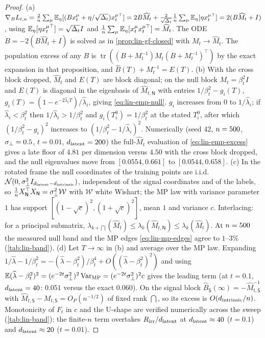 \begin{proof}
(a) $\nabla_BL_{t,n}=\frac2n\sum_\mu\mathbb{E}_\eta[(Bx_t^\mu+\eta/\sqrt{\Delta_t})x_t^{\mu\top}]=2B\widehat M_t+\frac{2}{\sqrt{\Delta_t}}\frac1n\sum_\mu\mathbb{E}_\eta[\eta x_t^{\mu\top}]=2(B\widehat M_t+I)$, using $\mathbb{E}_\eta[\eta x_t^{\mu\top}]=\sqrt{\Delta_t}I$ and $\frac1n\sum_\mu\mathbb{E}_\eta[x_t^\mu x_t^{\mu\top}]=\widehat M_t$. The ODE $\dot B=-2(B\widehat M_t+I)$ is solved as in \cref{prop:lin-gf-closed} with $M_t\to\widehat M_t$. The population excess of any $B$ is $\operatorname{tr}((B+M_t^{-1})M_t(B+M_t^{-1})^{\top})$ by the exact expansion in that proposition, and $\widehat B(T)+M_t^{-1}=E(T)$.
(b) With the cross block dropped, $\widehat M_t$ and $E(T)$ are block diagonal; on the null block $M_t=\beta_t^2I$ and $E(T)$ is diagonal in the eigenbasis of $\widehat M_{t,\mathsf N}$ with entries $1/\beta_t^2-g_i(T)$, $g_i(T)=(1-e^{-2\widehat\lambda_iT})/\widehat\lambda_i$, giving \eqref{eq:lin-emp-null}. $g_i$ increases from $0$ to $1/\widehat\lambda_i$; if $\widehat\lambda_i<\beta_t^2$ then $1/\widehat\lambda_i>1/\beta_t^2$ and $g_i(T^0_i)=1/\beta_t^2$ at the stated $T^0_i$, after which $(1/\beta_t^2-g_i)^2$ increases to $(1/\beta_t^2-1/\widehat\lambda_i)^2$. Numerically (seed 42, $n=500$, $\sigma_{\perp}=0.5$, $t=0.01$, $d_{\mathrm{latent}}=200$) the full-$\widehat M_t$ evaluation of \eqref{eq:lin-emp-excess} gives a late floor of $4.81$ per dimension versus $4.50$ with the cross block dropped, and the null eigenvalues move from $[0.0554,0.661]$ to $[0.0544,0.658]$.
(c) In the rotated frame the null coordinates of the training points are i.i.d.\ $\mathcal N(0,\sigma_{\perp}^2I_{d_{\mathrm{latent}}-d_{\mathrm{intrinsic}}})$, independent of the signal coordinates and of the labels, so $\frac1nX_{\mathsf N}^{\top}X_{\mathsf N}=\sigma_{\perp}^2\mathcal W$ with $\mathcal W$ white Wishart; the MP law with variance parameter $1$ has support $[(1-\sqrt c)^2,(1+\sqrt c)^2]$, mean $1$ and variance $c$. Interlacing: for a principal submatrix, $\lambda_{k+\dint}(\widehat M_t)\le\lambda_k(\widehat M_{t,\mathsf N})\le\lambda_k(\widehat M_t)$. At $n=500$ the measured null band and the MP edges \eqref{eq:lin-mp-edges} agree to $1$--$3\%$ (\cref{tab:lin-band}).
(d) Let $T\to\infty$ in (b) and average over the MP law. Expanding $1/\widehat\lambda-1/\beta_t^2=-(\widehat\lambda-\beta_t^2)/\beta_t^4+O((\widehat\lambda-\beta_t^2)^2)$ and using $\mathbb{E}(\widehat\lambda-\beta_t^2)^2=(e^{-2t}\sigma_{\perp}^2)^2\operatorname{Var}_{\rm MP}=(e^{-2t}\sigma_{\perp}^2)^2c$ gives the leading term (at $t=0.1$, $d_{\mathrm{latent}}=40$: $0.051$ versus the exact $0.060$). On the signal block $\widehat B_{\mathsf S}(\infty)=-\widehat M_{t,\mathsf S}^{-1}$ with $\widehat M_{t,\mathsf S}-M_{t,\mathsf S}=O_P(n^{-1/2})$ of fixed rank $\dint$, so its excess is $O(d_{\mathrm{intrinsic}}/n)$. Monotonicity of $F_t$ in $c$ and the U-shape are verified numerically across the sweep (\cref{tab:lin-band}): the finite-$n$ term overtakes $R_{\mathrm{irr}}/d_{\mathrm{latent}}$ at $d_{\mathrm{latent}}\approx40$ ($t=0.1$) and $d_{\mathrm{latent}}\approx20$ ($t=0.01$).
\end{proof}

